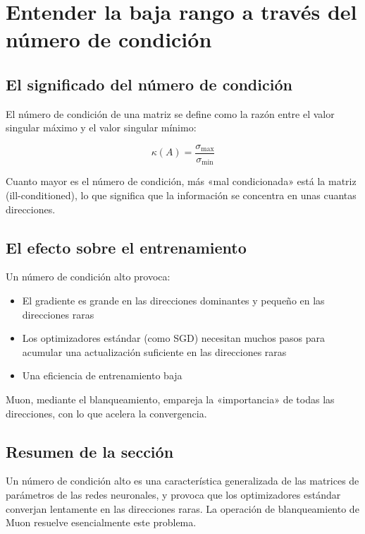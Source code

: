 \section{Entender la baja rango a través del número de condición}

\subsection{El significado del número de condición}

El número de condición de una matriz se define como la razón entre el valor singular máximo y el valor singular mínimo:

$$
\kappa(A) = \frac{\sigma_{\max}}{\sigma_{\min}}
$$

Cuanto mayor es el número de condición, más «mal condicionada» está la matriz (ill-conditioned), lo que significa que la información se concentra en unas cuantas direcciones.

\subsection{El efecto sobre el entrenamiento}

Un número de condición alto provoca:
\begin{itemize}
  \item El gradiente es grande en las direcciones dominantes y pequeño en las direcciones raras
  \item Los optimizadores estándar (como SGD) necesitan muchos pasos para acumular una actualización suficiente en las direcciones raras
  \item Una eficiencia de entrenamiento baja
\end{itemize}

Muon, mediante el blanqueamiento, empareja la «importancia» de todas las direcciones, con lo que acelera la convergencia.

\subsection{Resumen de la sección}

Un número de condición alto es una característica generalizada de las matrices de parámetros de las redes neuronales, y provoca que los optimizadores estándar converjan lentamente en las direcciones raras. La operación de blanqueamiento de Muon resuelve esencialmente este problema.

